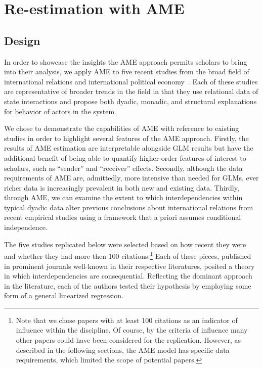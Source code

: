 \documentclass{article}[12pt]
\begin{document}
\section{\textbf{Re-estimation with AME}}
 

\subsection{Design}

In order to showcase the insights the AME approach permits scholars to
bring into their analysis, we apply AME to five recent studies from the broad field of international relations
and international political economy~\citep{reiter:stam:2003, mcdonald:2004,  rose:2004, weeks:2012,
  gibler:2017}. Each of these studies are representative of broader trends in the field in that they use
relational data of state interactions and propose both dyadic,
monadic, and structural explanations for behavior of actors in the system. 

We chose to demonstrate the capabilities of AME with reference
to existing studies in order to highlight several features of the
AME approach. Firstly, the results of AME estimation are interpretable
alongside GLM results but have the additional benefit of being able to
quantify higher-order features of interest to scholars, such as
``sender'' and ``receiver'' effects. Secondly, although the data
requirements of AME are, admittedly, more intensive than needed for GLMs, ever richer data
is increasingly prevalent in both new and existing data. Thirdly,
through AME, we can examine the extent to which interdependencies
within typical dyadic data alter previous conclusions about
international relations from recent empirical studies using a
framework that a priori assumes conditional independence.

The five studies replicated below were selected based on how recent they were and
whether they had more then 100 citations.\footnote{Note that we chose
  papers with at least 100 citations as an indicator of influence
  within the discipline. Of course, by the criteria of influence many
  other papers could have been considered for the
  replication. However, as described in the following sections, the
  AME model has specific data requirements, which limited the scope of
  potential papers.}  Each of these pieces, published in prominent
journals well-known in their respective literatures, posited a theory
in which interdependencies are consequential. Reflecting the
dominant approach in the literature, each of the authors tested their
hypothesis by employing some form of a general linearized
regression. 
 
\end{document}
